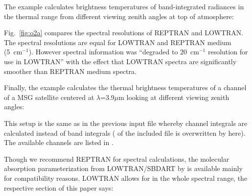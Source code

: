 The example  calculates brightness temperatures of band-integrated radiances in the thermal range
from different viewing zenith angles at top of atmosphere:


Fig.~\ref{fig:o2a} compares the spectral resolutions of REPTRAN and LOWTRAN.
The spectral resolutions are equal for LOWTRAN and REPTRAN medium (5~cm$^{-1}$). 
However spectral information was 
``degraded to 20~cm$^{-1}$ resolution for use in LOWTRAN'' \citep{Ricchiazzi1998b} with the effect that LOWTRAN spectra
are significantly smoother than REPTRAN medium spectra.

Finally, the example  calculates the thermal brightness temperatures of a channel of a MSG satellite centered at $\lambda$=3.9$\mu$m looking at different viewing zenith angles:


This setup is the same as in the previous input file whereby channel integrals are calculated instead of band integrals ( of the included file is overwritten by  here).
The available channels are listed in .

Though we recommend REPTRAN for spectral calculations, the molecular absorption parameterization from
LOWTRAN/SBDART by \citet{Ricchiazzi1998b} is available mainly for compatibility reasons.
LOWTRAN allows for  in the whole spectral range, the respective 
section of this paper says:


